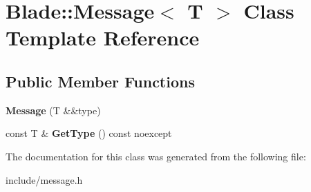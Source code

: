 \hypertarget{class_blade_1_1_message}{}\section{Blade\+:\+:Message$<$ T $>$ Class Template Reference}
\label{class_blade_1_1_message}
\subsection*{Public Member Functions}
\begin{DoxyCompactItemize}
\item 
\mbox{\label{class_blade_1_1_message_a8ffc93ea0c8ab92ce3fabc98d43ec9a1}} 
{\bfseries Message} (T \&\&type)
\item 
\mbox{\label{class_blade_1_1_message_ab47922d6a73d5d01f8f740a926cef656}} 
const T \& {\bfseries Get\+Type} () const noexcept
\end{DoxyCompactItemize}


The documentation for this class was generated from the following file\+:\begin{DoxyCompactItemize}
\item 
include/message.\+h\end{DoxyCompactItemize}
